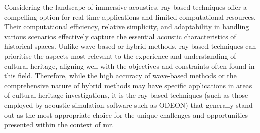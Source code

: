 Considering the landscape of immersive acoustics, ray-based techniques offer a compelling option for real-time applications and limited computational resources. Their computational efficiency, relative simplicity, and adaptability in handling various scenarios effectively capture the essential acoustic characteristics of historical spaces. Unlike wave-based or hybrid methods, ray-based techniques can prioritise the aspects most relevant to the experience and understanding of cultural heritage, aligning well with the objectives and constraints often found in this field. Therefore, while the high accuracy of wave-based methods or the comprehensive nature of hybrid methods may have specific applications in areas of cultural heritage investigations, it is the ray-based techniques (such as those employed by acoustic simulation software such as ODEON) that generally stand out as the most appropriate choice for the unique challenges and opportunities presented within the context of \acrshort{mr}.

